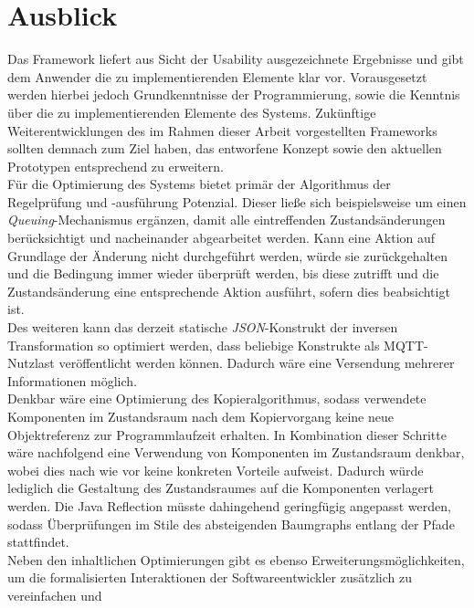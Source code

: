 \chapter{Ausblick}
\label{chap:ausblick}
    Das Framework liefert aus Sicht der Usability ausgezeichnete Ergebnisse und gibt dem Anwender die zu implementierenden Elemente klar vor. 
    Vorausgesetzt werden hierbei jedoch Grundkenntnisse der Programmierung, sowie die Kenntnis über die zu implementierenden Elemente des Systems. 
    Zukünftige Weiterentwicklungen des im Rahmen dieser Arbeit vorgestellten Frameworks sollten demnach zum Ziel haben, das entworfene Konzept 
    sowie den aktuellen Prototypen entsprechend zu erweitern. 
    \\
    \linebreak
    Für die Optimierung des Systems bietet primär der Algorithmus der Regelprüfung und -ausführung Potenzial. Dieser ließe sich beispielsweise 
    um einen \textit{Queuing}-Mechanismus ergänzen, damit alle eintreffenden Zustandsänderungen berücksichtigt und nacheinander abgearbeitet werden. 
    Kann eine Aktion auf Grundlage der Änderung nicht durchgeführt werden, würde sie zurückgehalten und die Bedingung immer wieder überprüft 
    werden, bis diese zutrifft und die Zustandsänderung eine entsprechende Aktion ausführt, sofern dies beabsichtigt ist. 
    \\
    \linebreak
    Des weiteren kann das derzeit statische \textit{JSON}-Konstrukt der inversen Transformation so optimiert werden, dass beliebige Konstrukte 
    als \acs{MQTT}-Nutzlast veröffentlicht werden können. Dadurch wäre eine Versendung mehrerer Informationen möglich. 
    \\
    Denkbar wäre eine Optimierung des Kopieralgorithmus, sodass verwendete Komponenten im Zustandsraum nach dem Kopiervorgang keine neue 
    Objektreferenz zur Programmlaufzeit erhalten. In Kombination dieser Schritte wäre nachfolgend eine Verwendung von Komponenten im Zustandsraum denkbar, wobei 
    dies nach wie vor keine konkreten Vorteile aufweist. Dadurch würde lediglich die Gestaltung des Zustandsraumes auf die Komponenten verlagert werden. 
    Die Java Reflection müsste dahingehend geringfügig angepasst werden, sodass Überprüfungen im Stile des absteigenden Baumgraphs entlang der Pfade stattfindet.
    \\
    \linebreak
    Neben den inhaltlichen Optimierungen gibt es ebenso Erweiterungsmöglichkeiten, um die formalisierten Interaktionen der Softwareentwickler zusätzlich zu vereinfachen und 
